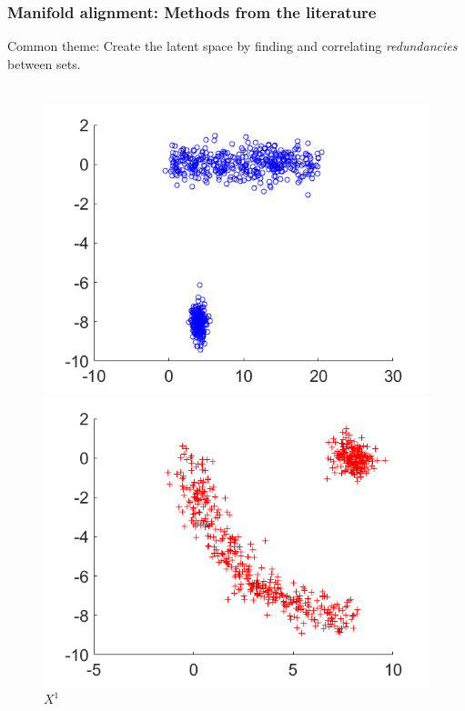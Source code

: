 \documentclass{beamer}
\begin{document}
\begin{frame}
  \frametitle{Manifold alignment: Methods from the literature}
  
  Common theme: Create the latent space by finding and correlating \emph{redundancies} between sets.\\~\\
  \begin{figure}
    \hfill
    \begin{minipage}[b]{0.32\linewidth}
      \centering
      \includegraphics[width=\textwidth]{./Images/Synthetic2/X1.png}
      \caption{$X^1$}
    \end{minipage}
    \hfill
    \begin{minipage}[b]{0.32\linewidth}
      \centering
      \includegraphics[width=\textwidth]{./Images/Synthetic2/X2.png}

\end{minipage}
\end{figure}
\end{frame}
\end{document}
